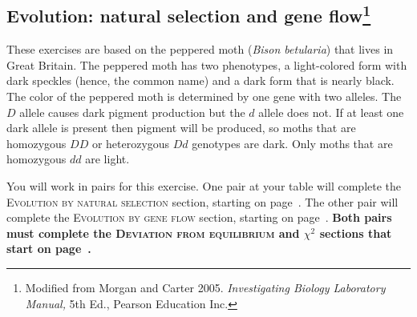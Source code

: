 \documentclass[12pt, hidelinks]{exam}
\newcommand{\allele}[1]{$#1$}
\begin{document}
\subsection*{Evolution: natural selection and gene flow\footnote{Modified from Morgan and Carter 2005. \emph{Investigating Biology Laboratory Manual,} 5th Ed., Pearson Education Inc.}}

These exercises are based on the peppered moth (\textit{Bison betularia}) that lives in Great Britain. The peppered moth has two phenotypes, a light-colored form with dark speckles (hence, the common name) and a dark form that is nearly black. The color of the peppered moth is determined by one gene with two alleles. The \allele{D} allele causes dark pigment production but the \allele{d} allele does not. If at least one dark allele is present then pigment will be produced, so moths that are homozygous \allele{DD} or heterozygous \allele{Dd} genotypes are dark. Only moths that are homozygous \allele{dd} are light. 

You will work in pairs for this exercise. One pair at your table will complete the \textsc{Evolution by natural selection} section, starting on page~\pageref{sec:natural_selection}. The other pair will complete the \textsc{Evolution by gene flow} section, starting on page~\pageref{sec:gene_flow}. \textbf{Both pairs must complete the \textsc{Deviation from equilibrium} and $\chi^2$ sections that start on page~\pageref{sec:chi_square}.}
\end{document}
